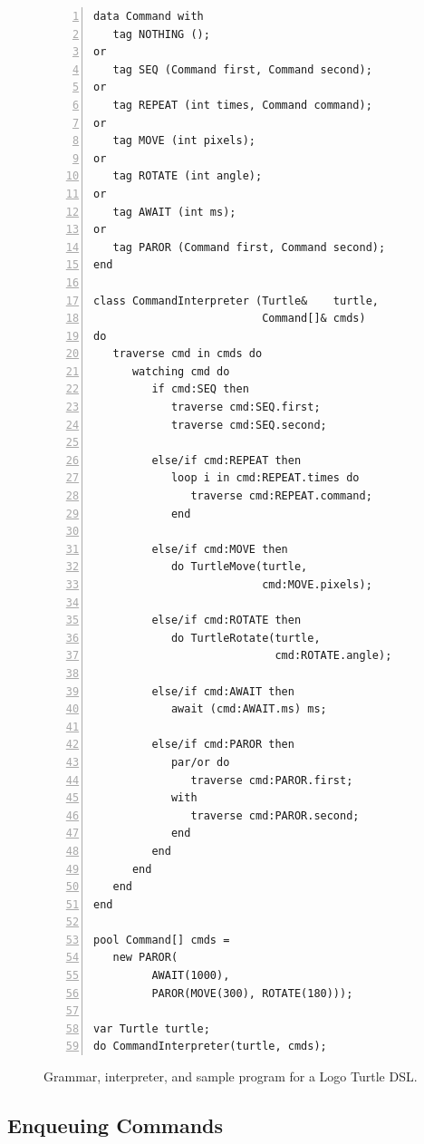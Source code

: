 \documentclass{sig-alternate}
\begin{document}
\begin{figure}[t!]
\begin{lstlisting}[numbers=left,xleftmargin=3em]
data Command with
   tag NOTHING ();
or
   tag SEQ (Command first, Command second);
or
   tag REPEAT (int times, Command command);
or
   tag MOVE (int pixels);
or
   tag ROTATE (int angle);
or
   tag AWAIT (int ms);
or
   tag PAROR (Command first, Command second);
end

class CommandInterpreter (Turtle&    turtle,
                          Command[]& cmds)
do
   traverse cmd in cmds do
      watching cmd do
         if cmd:SEQ then
            traverse cmd:SEQ.first;
            traverse cmd:SEQ.second;

         else/if cmd:REPEAT then
            loop i in cmd:REPEAT.times do
               traverse cmd:REPEAT.command;
            end

         else/if cmd:MOVE then
            do TurtleMove(turtle,
                          cmd:MOVE.pixels);

         else/if cmd:ROTATE then
            do TurtleRotate(turtle,
                            cmd:ROTATE.angle);

         else/if cmd:AWAIT then
            await (cmd:AWAIT.ms) ms;

         else/if cmd:PAROR then
            par/or do
               traverse cmd:PAROR.first;
            with
               traverse cmd:PAROR.second;
            end
         end
      end
   end
end

pool Command[] cmds =
   new PAROR(
         AWAIT(1000),
         PAROR(MOVE(300), ROTATE(180)));

var Turtle turtle;
do CommandInterpreter(turtle, cmds);
\end{lstlisting}
\caption{Grammar, interpreter, and sample program for a Logo Turtle DSL.
\label{lst.turtle}
}
\end{figure}

\subsection{Enqueuing Commands}
\label{sub.enqueuing}
\end{document}
